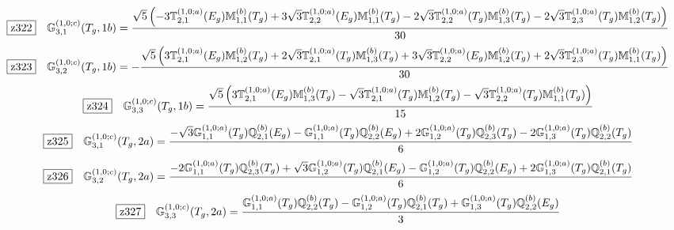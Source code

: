 \documentclass[fleqn,10pt,landscape]{jsarticle}
\begin{document}
\begin{dmath*}
\hspace*{3mm}\fbox{z322}\quad \mathbb{G}_{3,1}^{(1,0;c)}(T_{g},1b)=\frac{\sqrt{5} \left(- 3 \mathbb{T}_{2,1}^{(1,0;a)}(E_{g}) \mathbb{M}_{1,1}^{(b)}(T_{g}) + 3 \sqrt{3} \mathbb{T}_{2,2}^{(1,0;a)}(E_{g}) \mathbb{M}_{1,1}^{(b)}(T_{g}) - 2 \sqrt{3} \mathbb{T}_{2,2}^{(1,0;a)}(T_{g}) \mathbb{M}_{1,3}^{(b)}(T_{g}) - 2 \sqrt{3} \mathbb{T}_{2,3}^{(1,0;a)}(T_{g}) \mathbb{M}_{1,2}^{(b)}(T_{g})\right)}{30}
\end{dmath*}
\begin{dmath*}
\hspace*{3mm}\fbox{z323}\quad \mathbb{G}_{3,2}^{(1,0;c)}(T_{g},1b)=- \frac{\sqrt{5} \left(3 \mathbb{T}_{2,1}^{(1,0;a)}(E_{g}) \mathbb{M}_{1,2}^{(b)}(T_{g}) + 2 \sqrt{3} \mathbb{T}_{2,1}^{(1,0;a)}(T_{g}) \mathbb{M}_{1,3}^{(b)}(T_{g}) + 3 \sqrt{3} \mathbb{T}_{2,2}^{(1,0;a)}(E_{g}) \mathbb{M}_{1,2}^{(b)}(T_{g}) + 2 \sqrt{3} \mathbb{T}_{2,3}^{(1,0;a)}(T_{g}) \mathbb{M}_{1,1}^{(b)}(T_{g})\right)}{30}
\end{dmath*}
\begin{dmath*}
\hspace*{3mm}\fbox{z324}\quad \mathbb{G}_{3,3}^{(1,0;c)}(T_{g},1b)=\frac{\sqrt{5} \left(3 \mathbb{T}_{2,1}^{(1,0;a)}(E_{g}) \mathbb{M}_{1,3}^{(b)}(T_{g}) - \sqrt{3} \mathbb{T}_{2,1}^{(1,0;a)}(T_{g}) \mathbb{M}_{1,2}^{(b)}(T_{g}) - \sqrt{3} \mathbb{T}_{2,2}^{(1,0;a)}(T_{g}) \mathbb{M}_{1,1}^{(b)}(T_{g})\right)}{15}
\end{dmath*}
\begin{dmath*}
\hspace*{3mm}\fbox{z325}\quad \mathbb{G}_{3,1}^{(1,0;c)}(T_{g},2a)=\frac{- \sqrt{3} \mathbb{G}_{1,1}^{(1,0;a)}(T_{g}) \mathbb{Q}_{2,1}^{(b)}(E_{g}) - \mathbb{G}_{1,1}^{(1,0;a)}(T_{g}) \mathbb{Q}_{2,2}^{(b)}(E_{g}) + 2 \mathbb{G}_{1,2}^{(1,0;a)}(T_{g}) \mathbb{Q}_{2,3}^{(b)}(T_{g}) - 2 \mathbb{G}_{1,3}^{(1,0;a)}(T_{g}) \mathbb{Q}_{2,2}^{(b)}(T_{g})}{6}
\end{dmath*}
\begin{dmath*}
\hspace*{3mm}\fbox{z326}\quad \mathbb{G}_{3,2}^{(1,0;c)}(T_{g},2a)=\frac{- 2 \mathbb{G}_{1,1}^{(1,0;a)}(T_{g}) \mathbb{Q}_{2,3}^{(b)}(T_{g}) + \sqrt{3} \mathbb{G}_{1,2}^{(1,0;a)}(T_{g}) \mathbb{Q}_{2,1}^{(b)}(E_{g}) - \mathbb{G}_{1,2}^{(1,0;a)}(T_{g}) \mathbb{Q}_{2,2}^{(b)}(E_{g}) + 2 \mathbb{G}_{1,3}^{(1,0;a)}(T_{g}) \mathbb{Q}_{2,1}^{(b)}(T_{g})}{6}
\end{dmath*}
\begin{dmath*}
\hspace*{3mm}\fbox{z327}\quad \mathbb{G}_{3,3}^{(1,0;c)}(T_{g},2a)=\frac{\mathbb{G}_{1,1}^{(1,0;a)}(T_{g}) \mathbb{Q}_{2,2}^{(b)}(T_{g}) - \mathbb{G}_{1,2}^{(1,0;a)}(T_{g}) \mathbb{Q}_{2,1}^{(b)}(T_{g}) + \mathbb{G}_{1,3}^{(1,0;a)}(T_{g}) \mathbb{Q}_{2,2}^{(b)}(E_{g})}{3}
\end{dmath*}
\end{document}
